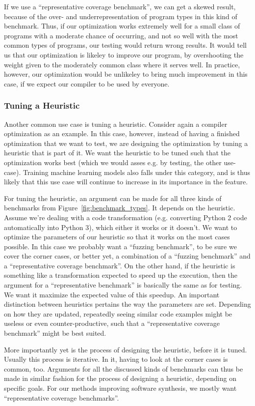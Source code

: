 If we use a ``representative coverage benchmark'', we can get a skewed result, because of the over- and underrepresentation of program types in this kind of benchmark.
Thus, if our optimization works extremely well for a small class of programs with a moderate chance of occurring, and not so well with the most common types of programs, our testing would return wrong results.
It would tell us that our optimization is likeley to improve our program, by overshooting the weight given to the moderately common class where it serves well.
In practice, however, our optimization would be unlikeley to bring much improvement in this case, if we expect our compiler to be used by everyone.

\subsubsection{Tuning a Heuristic}
\label{sec:tuning}

Another common use case is tuning a heuristic. Consider again a compiler optimization as an example. In this case, however, instead of having a finished optimization that we want to test, we are designing the optimization by tuning a heuristic that is part of it.
We want the heuristic to be tuned such that the optimization works best (which we would asses e.g. by testing, the other use-case).
Training machine learning models also falls under this category, and is thus likely that this use case will continue to increase in its importance in the feature.

For tuning the heuristic, an argument can be made for all three kinds of benchmarks from Figure~\ref{fig:benchmark_types}. It depends on the heuristic.
Assume we're dealing with a code transformation (e.g. converting Python 2 code automatically into Python 3),  which either it works or it doesn't. We want to optimize the parameters of our heuristic so that it works on the most cases possible.
In this case we probably want a ``fuzzing benchmark'', to be sure we cover the corner cases, or better yet, a combination of a ``fuzzing benchmark'' and a ``representative coverage benchmark''.
On the other hand, if the heuristic is something like a transformation expected to speed up the execution, then the argument for a ``representative benchmark'' is basically the same as for testing.
We want it maximize the expected value of this speedup.
An important distinction between heuristics pertains the way the parameters are set. Depending on how they are updated, repeatedly seeing similar code examples might be useless or even counter-productive, such that a ``representative coverage benchmark'' might be best suited.

More importantly yet is the process of designing the heuristic, before it is tuned. Usually this process is iterative. In it, having to look at the corner cases is common, too.
Arguments for all the discussed kinds of benchmarks can thus be made in similar fashion for the process of designing a heuristic, depending on specific goals.
For our methods improving software synthesis, we mostly want ``representative coverage benchmarks''.

